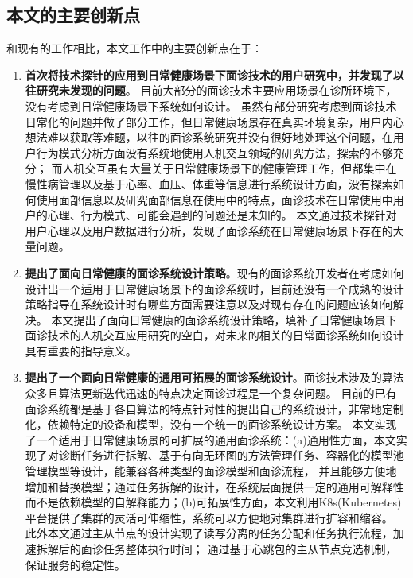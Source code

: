 \subsection{本文的主要创新点}
和现有的工作相比，本文工作中的主要创新点在于：
\begin{enumerate}
    \item \textbf{首次将技术探针的应用到日常健康场景下面诊技术的用户研究中，并发现了以往研究未发现的问题}。
    目前大部分的面诊技术主要应用场景在诊所环境下，没有考虑到日常健康场景下系统如何设计。
虽然有部分研究考虑到面诊技术日常化的问题并做了部分工作，但日常健康场景存在真实环境复杂，用户内心想法难以获取等难题，以往的面诊系统研究并没有很好地处理这个问题，在用户行为模式分析方面没有系统地使用人机交互领域的研究方法，探索的不够充分；
而人机交互虽有大量关于日常健康场景下的健康管理工作，但都集中在慢性病管理以及基于心率、血压、体重等信息进行系统设计方面，没有探索如何使用面部信息以及研究面部信息在使用中的特点，面诊技术在日常使用中用户的心理、行为模式、可能会遇到的问题还是未知的。
本文通过技术探针对用户心理以及用户数据进行分析，发现了面诊系统在日常健康场景下存在的大量问题。

\item \textbf{提出了面向日常健康的面诊系统设计策略}。现有的面诊系统开发者在考虑如何设计出一个适用于日常健康场景下的面诊系统时，目前还没有一个成熟的设计策略指导在系统设计时有哪些方面需要注意以及对现有存在的问题应该如何解决。
    本文提出了面向日常健康的面诊系统设计策略，填补了日常健康场景下面诊技术的人机交互应用研究的空白\cite{ding2019reading}，对未来的相关的日常面诊系统如何设计具有重要的指导意义。

\item \textbf{提出了一个面向日常健康的通用可拓展的面诊系统设计}。面诊技术涉及的算法众多且算法更新迭代迅速的特点决定面诊过程是一个复杂问题。
    目前的已有面诊系统都是基于各自算法的特点针对性的提出自己的系统设计，非常地定制化，依赖特定的设备和模型，没有一个统一的面诊系统设计方案。
    本文实现了一个适用于日常健康场景的可扩展的通用面诊系统：(a)通用性方面，本文实现了对诊断任务进行拆解、基于有向无环图的方法管理任务、容器化的模型池管理模型等设计，能兼容各种类型的面诊模型和面诊流程，
            并且能够方便地增加和替换模型；通过任务拆解的设计，在系统层面提供一定的通用可解释性而不是依赖模型的自解释能力；(b)可拓展性方面，本文利用K8s(Kubernetes)平台提供了集群的灵活可伸缩性，系统可以方便地对集群进行扩容和缩容。
            此外本文通过主从节点的设计实现了读写分离的任务分配和任务执行流程，加速拆解后的面诊任务整体执行时间；
            通过基于心跳包的主从节点竞选机制，保证服务的稳定性。
\end{enumerate}

